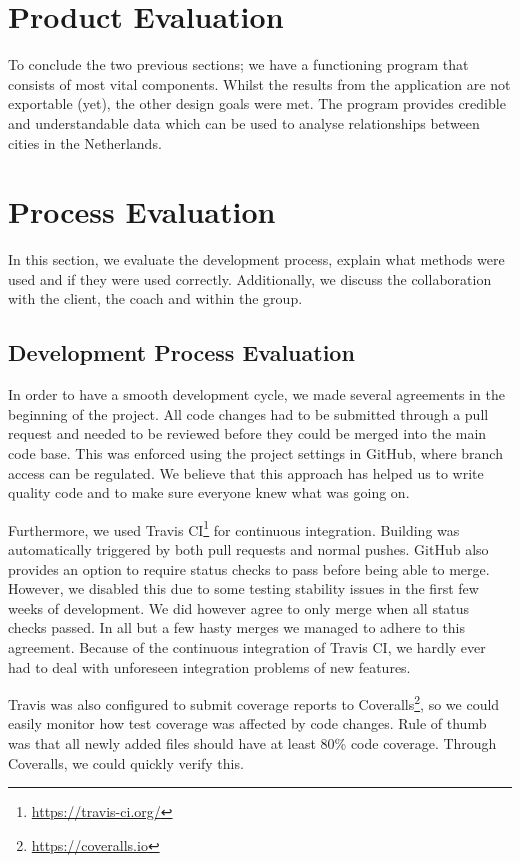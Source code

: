 \section{Product Evaluation}
To conclude the two previous sections; we have a functioning program that consists of most vital components. Whilst the results from the application are not exportable (yet), the other design goals were met. The program provides credible and understandable data which can be used to analyse relationships between cities in the Netherlands.

\section{Process Evaluation}
In this section, we evaluate the development process, explain what methods were used and if they were used correctly. Additionally, we discuss the collaboration with the client, the coach and within the group.

\subsection{Development Process Evaluation}
In order to have a smooth development cycle, we made several agreements in the beginning of the project. All code changes had to be submitted through a pull request and needed to be reviewed before they could be merged into the main code base. This was enforced using the project settings in GitHub, where branch access can be regulated. We believe that this approach has helped us to write quality code and to make sure everyone knew what was going on.

Furthermore, we used Travis CI\footnote{\url{https://travis-ci.org/}} for continuous integration. Building was automatically triggered by both pull requests and normal pushes. GitHub also provides an option to require status checks to pass before being able to merge. However, we disabled this due to some testing stability issues in the first few weeks of development. We did however agree to only merge when all status checks passed. In all but a few hasty merges we managed to adhere to this agreement. Because of the continuous integration of Travis CI, we hardly ever had to deal with unforeseen integration problems of new features.

Travis was also configured to submit coverage reports to Coveralls\footnote{\url{https://coveralls.io}}, so we could easily monitor how test coverage was affected by code changes. Rule of thumb was that all newly added files should have at least 80\% code coverage. Through Coveralls, we could quickly verify this.

